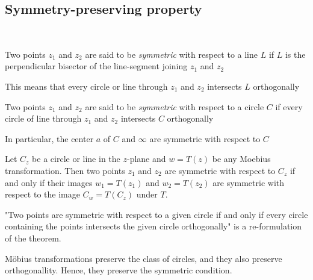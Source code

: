 \subsection{Symmetry-preserving property}\hfill\\\par
\noindent Two points $z_1$ and $z_2$ are said to be \textit{symmetric} with respect to a line $L$ if $L$ is the perpendicular bisector of the line-segment joining $z_1$ and $z_2$
\par\bigskip
\noindent This means that every circle or line through $z_1$  and $z_2$ intersects $L$ orthogonally
\par\bigskip
\begin{theo}[]{}
  Two points $z_1$ and $z_2$ are said to be \textit{symmetric} with respect to a circle $C$ if every circle of line through $z_1$ and $z_2$ intersects $C$ orthogonally
\end{theo}
\par\bigskip
\noindent In particular, the center $a$ of $C$ and $\infty$ are symmetric with respect to $C$
\par\bigskip
\begin{theo}{}
  Let $C_z$ be a circle or line in the $z$-plane and $w = T(z)$ be any Moebius transformation. Then two points $z_1$ and $z_2$ are symmetric with respect to $C_z$ if and only if their images $w_1 = T(z_1)$ and $w_2 = T(z_2)$ are symmetric with respect to the image $C_w = T(C_z)$ under $T$.
\end{theo}
\par\bigskip
\begin{prf}[]{}
  "Two points are symmetric with respect to a given circle if and only if every circle containing the points intersects the given circle orthogonally" is a re-formulation of the theorem.
  \par\bigskip
  \noindent Möbius transformations preserve the class of circles, and they also preserve orthogonallity. Hence, they preserve the symmetric condition. 
\end{prf}
